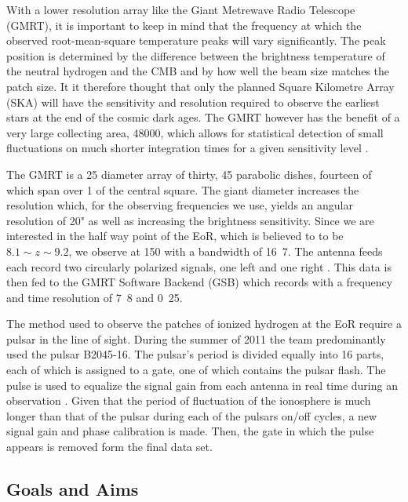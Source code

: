 \documentclass[a4paper,12pt]{article}
\begin{document}
With a lower resolution array like the Giant Metrewave Radio Telescope (GMRT), it is important to keep in mind that the frequency at which the observed root-mean-square temperature peaks will vary significantly. The peak position is determined by the difference between the brightness temperature of the neutral hydrogen and the CMB and by how well the beam size matches the patch size. It it therefore thought that only the planned Square Kilometre Array (SKA) will have the sensitivity and resolution required to observe the earliest stars at the end of the cosmic dark ages. The GMRT however has the benefit of a very large collecting area, \unit{48000}{\square\metre}, which allows for statistical detection of small fluctuations on much shorter integration times for a given sensitivity level \citep{characteranddetectability}.

The GMRT is a \unit{25}{\kilo\metre} diameter array of thirty, \unit{45}{\metre} parabolic dishes, fourteen of which span over \unit{1}{\kilo\metre\squared} of the central square.\citep{gmrtsearchforeor} The giant diameter increases the resolution which, for the observing frequencies we use, yields an angular resolution of  \unit{20}{"} as well as increasing the brightness sensitivity. Since we are interested in the half way point of the EoR, which is believed to to be $8.1 \sim z \sim 9.2$, we observe at \unit{150}{\mega\hertz} with a bandwidth of \unit{16.7}{\mega\hertz}\cite{gmrt}. The antenna feeds each record two circularly polarized signals, one left and one right \citep{gmrtsearchforeor}. This data is then fed to the GMRT Software Backend (GSB) which records with a frequency and time resolution of \unit{7.8}{\kilo\hertz} and \unit{0.25}{\second}. 

The method used to observe the patches of ionized hydrogen at the EoR require a pulsar in the line of sight. During the summer of 2011 the team predominantly used the pulsar B2045-16. The pulsar’s period is divided equally into 16 parts, each of which is assigned to a gate, one of which contains the pulsar flash. The pulse is used to equalize the signal gain from each antenna in real time during an observation \citep{gmrt}. Given that the period of fluctuation of the ionosphere is much longer than that of the pulsar during each of the pulsars on/off cycles, a new signal gain and phase calibration is made. Then, the gate in which the pulse appears is removed form the final data set.

\subsection{Goals and Aims}
\label{sec:goalsandaims}
\end{document}
